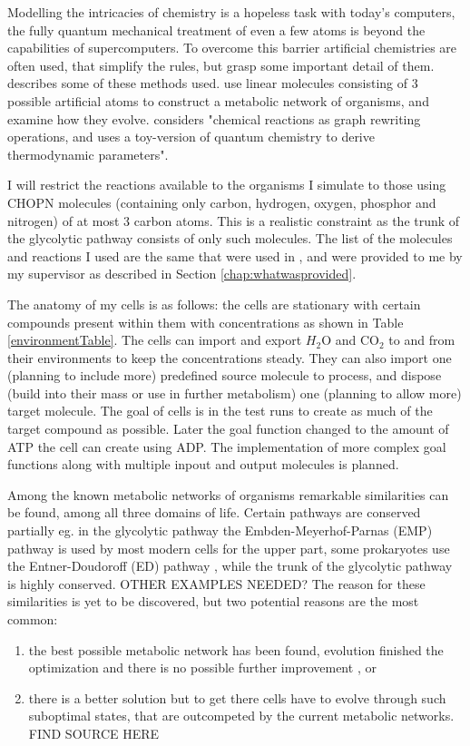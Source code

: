 \documentclass[10pt,a4paper]{article}
\begin{document}
	Modelling the intricacies of chemistry is a hopeless task with today's computers, the fully quantum mechanical treatment of even a few atoms is beyond the capabilities of supercomputers. To overcome this barrier artificial chemistries are often used, that simplify the rules, but grasp some important detail of them. \citeauthor{artificialreview} describes some of these methods used. \citeauthor{evolutioncomplex} use linear molecules consisting of 3 possible  artificial atoms to construct a metabolic network of organisms, and examine how they evolve. \citeauthor{computationalframework} considers "chemical reactions as graph rewriting operations, and uses a toy-version of quantum chemistry to derive thermodynamic parameters". 
	
	I will restrict the reactions available to the organisms I simulate to those using CHOPN molecules (containing only carbon, hydrogen, oxygen, phosphor and nitrogen) of at most 3 carbon atoms. This is a realistic constraint as the trunk of the glycolytic pathway consists of only such molecules. The list of the molecules and reactions I used are the same that were used in \citeauthor{BartekLower}, and were provided to me by my supervisor as described in Section \ref{chap:whatwasprovided}. 
	
	The anatomy of my cells is as follows: the cells are stationary with certain compounds present within them with concentrations as shown in Table \ref{environmentTable}. The cells can import and export $H_2$O and CO$_2$ to and from their environments to keep the concentrations steady. They can also import one (planning to include more) predefined source molecule to process, and dispose (build into their mass or use in further metabolism) one (planning to allow more) target molecule. The goal of cells is in the test runs to create as much of the target compound as possible. Later the goal function changed to the amount of ATP the cell can create using ADP. The implementation of more complex goal functions along with multiple inpout and output molecules is planned. 
	
	Among the known metabolic networks of organisms remarkable similarities can be found, among all three domains of life. Certain pathways are conserved partially  eg. in the glycolytic pathway the Embden-Meyerhof-Parnas (EMP) pathway \cite{EMPpathway} is used by most modern cells for the upper part,  some prokaryotes  use the Entner-Doudoroff (ED) pathway \cite{EDpathway}, while the trunk of the glycolytic pathway is highly conserved. OTHER EXAMPLES NEEDED? The reason for these similarities is yet to be discovered, but two potential reasons are the most common: 
	\begin{enumerate}[label=(\alph*)]
	\item the best possible metabolic network has been found, evolution finished the optimization and there is no possible further improvement \cite{theoretical} \cite{latent} \cite{strategy}, or 
	\item there is a better solution but to get there cells have to evolve through such suboptimal states, that are outcompeted by the current metabolic networks. FIND SOURCE HERE
	\end{enumerate} 
	
\end{document}

